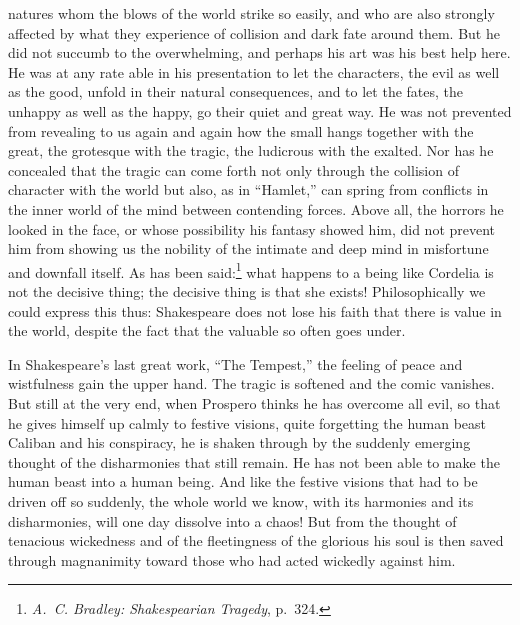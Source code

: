 \documentclass[12pt]{book}
\newcommand{\opage}[1]{\marginnote{\footnotesize\textit{[#1]}}}
\begin{document}
natures whom the blows of the world strike so easily, and who are also strongly affected
by what they experience of collision and dark fate around them. But he did not succumb
to the \opage{99}overwhelming, and perhaps his art was his best help here. He was at any
rate able in his presentation to let the characters, the evil as well as the good,
unfold in their natural consequences, and to let the fates, the unhappy as well as the
happy, go their quiet and great way. He was not prevented from revealing to us again and
again how the small hangs together with the great, the grotesque with the tragic, the
ludicrous with the exalted. Nor has he concealed that the tragic can come forth not only
through the collision of character with the world but also, as in ``Hamlet,'' can spring
from conflicts in the inner world of the mind between contending forces. Above all, the
horrors he looked in the face, or whose possibility his fantasy showed him, did not
prevent him from showing us the nobility of the intimate and deep mind in misfortune and
downfall itself. As has been said:\footnote{\textit{A.~C. Bradley: Shakespearian
Tragedy}, p.~324.} what happens to a being like Cordelia is not the decisive thing; the
decisive thing is that she exists! Philosophically we could express this thus: Shakespeare
does not lose his faith that there is value in the world, despite the fact that the
valuable so often goes under.

In Shakespeare's last great work, ``The Tempest,'' the feeling of peace and wistfulness
gain the upper hand. The tragic is softened and the comic vanishes. But still at the very
end, when Prospero thinks he has overcome all evil, so that he gives himself up calmly to
festive visions, quite forgetting the human beast Caliban and his conspiracy, he is shaken
through by the suddenly emerging thought of the disharmonies that still remain. He has
not been able to make the human beast into a human being. And like the festive visions
that had to be driven off so suddenly, the whole world we know, with its harmonies and
its disharmonies, will one day dissolve into a chaos! But from the thought of tenacious
wickedness and of the fleetingness of the glorious his soul is then saved through
magnanimity toward those who had acted wickedly against him.
\end{document}
